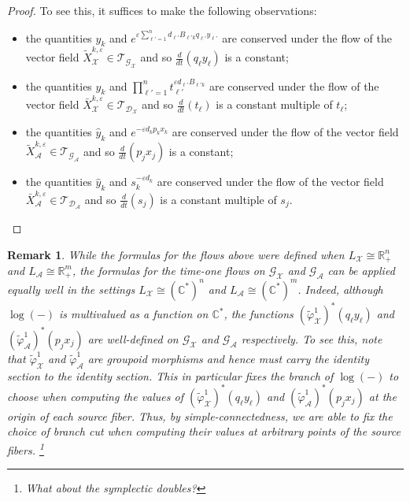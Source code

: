 \documentclass{amsart}
\newtheorem{remark}[theorem]{Remark}
\numberwithin{equation}{section}
\newcommand{\cA}{\mathcal{A}}
\newcommand{\cG}{\mathcal{G}}
\renewcommand{\cD}{\mathcal{D}}
\newcommand{\cX}{\mathcal{X}}
\newcommand{\cT}{\mathcal{T}}
\newcommand{\CC}{\mathbb{C}}
\newcommand{\RR}{\mathbb{R}}
\begin{document}
\begin{proof}
  To see this, it suffices to make the following observations:
  \begin{itemize}
    \item the quantities $y_k$ and $e^{\varepsilon\sum_{\ell'=1}^n d_{\ell'} B_{\ell' k}q_{\ell'} y_{\ell'}}$ are conserved under the flow of the vector field $\tilde X_\cX^{k,\varepsilon}\in\cT_{\cG_\cX}$ and so $\frac{d}{dt}(q_\ell y_\ell)$ is a constant;
    \item the quantities $y_k$ and $\prod_{\ell'=1}^nt_{\ell'}^{\varepsilon d_{\ell'} B_{\ell' k}}$ are conserved under the flow of the vector field $\bar X_\cX^{k,\varepsilon}\in\cT_{\cD_\cX}$ and so $\frac{d}{dt}(t_\ell)$ is a constant multiple of $t_\ell$;
    \item the quantities $\hat y_k$ and $e^{-\varepsilon d_kp_kx_k}$ are conserved under the flow of the vector field $\tilde X_\cA^{k,\varepsilon}\in\cT_{\cG_\cA}$ and so $\frac{d}{dt}(p_jx_j)$ is a constant;
    \item the quantities $\hat y_k$ and $s_k^{-\varepsilon d_k}$ are conserved under the flow of the vector field $\bar X_\cA^{k,\varepsilon}\in\cT_{\cD_\cA}$ and so $\frac{d}{dt}(s_j)$ is a constant multiple of $s_j$.
  \end{itemize}
\end{proof}
\begin{remark}
  While the formulas for the flows above were defined when $L_\cX\cong\RR_+^n$ and $L_\cA\cong\RR_+^m$, the formulas for the time-one flows on $\cG_\cX$ and $\cG_\cA$ can be applied equally well in the settings $L_\cX\cong(\CC^*)^n$ and $L_\cA\cong(\CC^*)^m$.
  Indeed, although $\log(-)$ is multivalued as a function on $\CC^*$, the functions $(\tilde\varphi_\cX^1)^*(q_\ell y_\ell)$ and $(\tilde\varphi_\cA^1)^*(p_jx_j)$ are well-defined on $\cG_\cX$ and $\cG_\cA$ respectively.
  To see this, note that $\tilde\varphi_\cX^1$ and $\tilde\varphi_\cA^1$ are groupoid morphisms and hence must carry the identity section to the identity section.
  This in particular fixes the branch of $\log(-)$ to choose when computing the values of $(\tilde\varphi_\cX^1)^*(q_\ell y_\ell)$ and $(\tilde\varphi_\cA^1)^*(p_jx_j)$ at the origin of each source fiber.
  Thus, by simple-connectedness, we are able to fix the choice of branch cut when computing their values at arbitrary points of the source fibers. 
  \footnote{What about the symplectic doubles?}
\end{remark}
  
\end{document}
